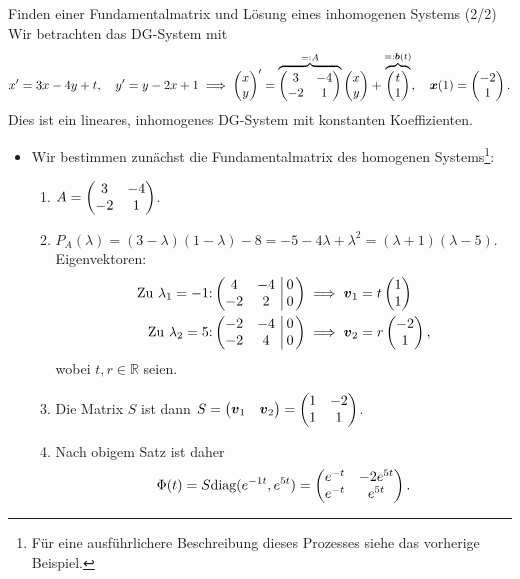 \begin{Beispiel}
{Finden einer Fundamentalmatrix und Lösung eines inhomogenen Systems (2/2)}
Wir betrachten das DG-System mit
\begin{equation*}
    x'=3x-4y+t,\quad y'=y-2x+1\implies\begin{pmatrix}x\\y\end{pmatrix}'=\overbrace{\begin{pmatrix}3&-4\\-2&1\end{pmatrix}}^{=:A}\begin{pmatrix}x\\y\end{pmatrix}+\overbrace{\begin{pmatrix}t\\1\end{pmatrix}}^{=:{{\text{\boldmath${b}$}}}(t)},\quad {{\text{\boldmath${x}$}}}(1)=\begin{pmatrix}-2\\1\end{pmatrix}.
\end{equation*}
Dies ist ein lineares, inhomogenes DG-System mit konstanten Koeffizienten.
\begin{itemize}
    \item Wir bestimmen zunächst die Fundamentalmatrix des homogenen Systems\footnote{Für eine ausführlichere Beschreibung dieses Prozesses siehe das vorherige Beispiel.}:
    \begin{enumerate}
        \item $A=\begin{pmatrix}3&-4\\-2&1\end{pmatrix}$.
        \item $P_A(\lambda)=(3-\lambda)(1-\lambda)-8=-5-4\lambda+\lambda^2=(\lambda+1)(\lambda-5)$.\\
        Eigenvektoren:
        \begin{align*}
            \text{Zu $\lambda_1=-1$:}&\left(\begin{matrix}4&-4\\-2&2\end{matrix}\,\left|\,\begin{matrix}0\\0\end{matrix}\right.\right)\implies {{\text{\boldmath${v}$}}}_1=t\begin{pmatrix}1\\1\end{pmatrix}\\
            \text{Zu $\lambda_2=5$:}&\left(\begin{matrix}-2&-4\\-2&4\end{matrix}\,\left|\,\begin{matrix}0\\0\end{matrix}\right.\right)\implies {{\text{\boldmath${v}$}}}_2=r\begin{pmatrix}-2\\1\end{pmatrix},
        \end{align*}
        wobei $t,r\in\mathbb{R}$ seien.
        \item Die Matrix $S$ ist dann $S=\begin{pmatrix}{{\text{\boldmath${v}$}}}_1&{{\text{\boldmath${v}$}}}_2\end{pmatrix}=\begin{pmatrix}1&-2\\1&1\end{pmatrix}$.
        \item Nach obigem Satz ist daher
        \begin{equation*}
            \Phi(t)=S\text{diag}(e^{-1t},e^{5t})=\begin{pmatrix}e^{-t}&-2e^{5t}\\e^{-t}&e^{5t}\end{pmatrix}.
        \end{equation*}
    \end{enumerate}

\end{itemize}
\end{Beispiel}
